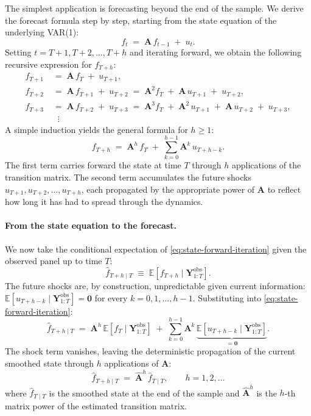 \documentclass[11pt, a4paper, oneside]{article}
\begin{document}
The simplest application is forecasting beyond the end of the sample.
We derive the forecast formula step by step, starting from the state
equation of the underlying VAR(1):
\[
f_t \;=\; \mathbf{A}\, f_{t-1} \;+\; u_t.
\]
Setting $t = T+1, T+2, \ldots, T+h$ and iterating forward, we obtain
the following recursive expression for $f_{T+h}$:
\begin{align*}
f_{T+1} \;&=\; \mathbf{A}\, f_T \;+\; u_{T+1}, \\[2pt]
f_{T+2} \;&=\; \mathbf{A}\, f_{T+1} \;+\; u_{T+2}
            \;=\; \mathbf{A}^2 f_T \;+\; \mathbf{A}\, u_{T+1} \;+\; u_{T+2}, \\[2pt]
f_{T+3} \;&=\; \mathbf{A}\, f_{T+2} \;+\; u_{T+3}
            \;=\; \mathbf{A}^3 f_T \;+\; \mathbf{A}^2\, u_{T+1} \;+\; \mathbf{A}\, u_{T+2} \;+\; u_{T+3}, \\[2pt]
\;&\;\;\vdots
\end{align*}
A simple induction yields the general formula for $h \geq 1$:
\begin{equation}
f_{T+h} \;=\; \mathbf{A}^h\, f_T \;+\; \sum_{k=0}^{h-1} \mathbf{A}^{k}\, u_{T+h-k}.
\label{eq:state-forward-iteration}
\end{equation}
The first term carries forward the state at time $T$ through $h$
applications of the transition matrix. The second term accumulates
the future shocks $u_{T+1}, u_{T+2}, \ldots, u_{T+h}$, each
propagated by the appropriate power of $\mathbf{A}$ to reflect how
long it has had to spread through the dynamics.

\paragraph{From the state equation to the forecast.}
We now take the conditional expectation of \eqref{eq:state-forward-iteration}
given the observed panel up to time $T$:
\[
\hat{f}_{T+h \mid T} \;\equiv\; \mathbb{E}[f_{T+h} \mid \mathbf{Y}^{\mathrm{obs}}_{1:T}].
\]
The future shocks are, by construction, unpredictable given current
information: $\mathbb{E}[u_{T+h-k} \mid \mathbf{Y}^{\mathrm{obs}}_{1:T}] = \mathbf{0}$
for every $k = 0, 1, \ldots, h-1$. Substituting into
\eqref{eq:state-forward-iteration}:
\[
\hat{f}_{T+h \mid T}
\;=\; \mathbf{A}^h\, \mathbb{E}[f_T \mid \mathbf{Y}^{\mathrm{obs}}_{1:T}]
\;+\; \sum_{k=0}^{h-1} \mathbf{A}^{k}\, \underbrace{\mathbb{E}[u_{T+h-k} \mid \mathbf{Y}^{\mathrm{obs}}_{1:T}]}_{= \mathbf{0}}.
\]
The shock term vanishes, leaving the deterministic propagation of
the current smoothed state through $h$ applications of $\mathbf{A}$:
\begin{equation}
\boxed{\;\hat{f}_{T+h \mid T} \;=\; \hat{\mathbf{A}}^h\, \hat{f}_{T \mid T}, \qquad h = 1, 2, \ldots\;}
\label{eq:state-forecast}
\end{equation}
where $\hat{f}_{T \mid T}$ is the smoothed state at the end of the
sample and $\hat{\mathbf{A}}^h$ is the $h$-th matrix power of the
estimated transition matrix.
\end{document}
